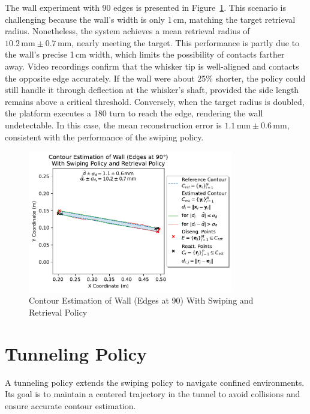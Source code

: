 The wall experiment with 90\degree{} edges is presented in Figure~\ref{fig:experiment-wall-edges-90deg-swiping-retrieval}.
This scenario is challenging because the wall's width is only 1\,cm, matching the target retrieval radius.
Nonetheless, the system achieves a mean retrieval radius of $10.2\,\text{mm} \pm 0.7\,\text{mm}$, nearly meeting the target.
This performance is partly due to the wall's precise 1\,cm width, which limits the possibility of contacts farther away.
Video recordings confirm that the whisker tip is well-aligned and contacts the opposite edge accurately.
If the wall were about 25\% shorter, the policy could still handle it through deflection at the whisker's shaft, provided the side length remains above a critical threshold.
Conversely, when the target radius is doubled, the platform executes a 180\degree{} turn to reach the edge, rendering the wall undetectable.
In this case, the mean reconstruction error is $1.1\,\text{mm} \pm 0.6\,\text{mm}$, consistent with the performance of the swiping policy.

\begin{figure}[!htb]
    \centering
    \includegraphics[width=0.8\textwidth]{figures/experiments/wall-edges-90deg-swiping-retrieval}
    \caption{Contour Estimation of Wall (Edges at 90\degree{}) With Swiping and Retrieval Policy}
    \label{fig:experiment-wall-edges-90deg-swiping-retrieval}
\end{figure}


\section{Tunneling Policy}
A tunneling policy extends the swiping policy to navigate confined environments.
Its goal is to maintain a centered trajectory in the tunnel to avoid collisions and ensure accurate contour estimation.

